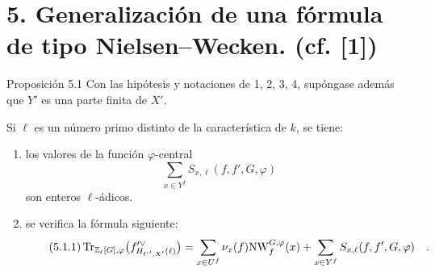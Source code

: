 \section*{5. Generalización de una fórmula de tipo Nielsen--Wecken. {\normalfont (cf. [1])}}

\begin{statement}{Proposición 5.1}
Con las hipótesis y notaciones de 1, 2, 3, 4, supóngase además que $Y'$ es una parte finita de $X'$.

Si $\ell$ es un número primo distinto de la característica de $k$, se tiene:
\begin{enumerate}[label=\alph*)]
\item los valores de la función $\varphi$-central
\[
\sum_{x\in Y^f} S_{x,\ell}(f,f',G,\varphi)
\]
son enteros $\ell$-ádicos.
\item se verifica la fórmula siguiente:
\begin{equation}\tag{5.1.1}
\operatorname{Tr}_{\mathbb Z_\ell[G],\varphi}\bigl(f'^\vee_{H_{U',X'}(\ell)}\bigr)
= \sum_{x\in U^f}\nu_x(f)\mathrm{NW}^{G,\varphi}_f(x)+\sum_{x\in Y^f}S_{x,\ell}(f,f',G,\varphi) \quad .
\end{equation}
\end{enumerate}
\end{statement}
